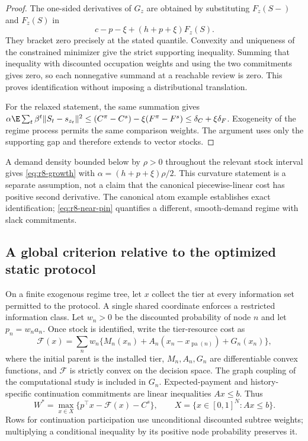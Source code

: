 \begin{proof}
The one-sided derivatives of $G_z$ are obtained by substituting $F_z(S-)$ and $F_z(S)$ in
\[
 c-p-\xi+(h+p+\xi)F_z(S).
\]
They bracket zero precisely at the stated quantile. Convexity and uniqueness of the constrained minimizer give the strict supporting inequality. Summing that inequality with discounted occupation weights and using the two commitments gives zero, so each nonnegative summand at a reachable review is zero. This proves identification without imposing a distributional translation.

For the relaxed statement, the same summation gives
$\alpha\E\sum_t\beta^t\|S_t-s_{z_t}\|^2\leq
(C^\pi-C^s)-\xi(F^\pi-F^s)\leq\delta_C+\xi\delta_F$.
Exogeneity of the regime process permits the same comparison weights. The argument uses only the supporting gap and therefore extends to vector stocks.
\end{proof}
A demand density bounded below by $\rho>0$ throughout the relevant stock interval gives \eqref{eq:r8-growth} with $\alpha=(h+p+\xi)\rho/2$. This curvature statement is a separate assumption, not a claim that the canonical piecewise-linear cost has positive second derivative. The canonical atom example establishes exact identification; \eqref{eq:r8-near-pin} quantifies a different, smooth-demand regime with slack commitments.

\subsection{A global criterion relative to the optimized static protocol}
On a finite exogenous regime tree, let $x$ collect the tier at every information set permitted to the protocol. A single shared coordinate enforces a restricted information class. Let $w_n>0$ be the discounted probability of node $n$ and let $p_n=w_na_n$. Once stock is identified, write the tier-resource cost as
\begin{equation}\label{eq:r8-F}
 \mathcal F(x)=\sum_n w_n\{M_n(x_n)+A_n(x_n-x_{\operatorname{pa}(n)})
                         +G_n(x_n)\},
\end{equation}
where the initial parent is the installed tier, $M_n,A_n,G_n$ are differentiable convex functions, and $\mathcal F$ is strictly convex on the decision space. The graph coupling of the computational study is included in $G_n$. Expected-payment and history-specific continuation commitments are linear inequalities $Ax\leq b$. Thus
\begin{equation}\label{eq:r8-convex}
 W^*=\max_{x\in X}\{p^\top x-\mathcal F(x)-C^s\},\qquad
 X=\{x\in[0,1]^N:Ax\leq b\}.
\end{equation}
Rows for continuation participation use unconditional discounted subtree weights; multiplying a conditional inequality by its positive node probability preserves it.

